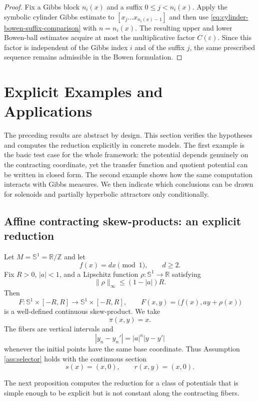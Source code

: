 \documentclass[11pt,a4paper]{article}
\newcommand{\eps}{\varepsilon}
\begin{document}
\begin{proof}
Fix a Gibbs block $n_i(x)$ and a suffix $0\le j<n_i(x)$. Apply the symbolic
cylinder Gibbs estimate to $[x_j\ldots x_{n_i(x)-1}]$ and then use
\eqref{eq:cylinder-bowen-suffix-comparison} with $n=n_i(x)$. The resulting
upper and lower Bowen-ball estimates acquire at most the multiplicative factor
$C(\eps)$. Since this factor is independent of the Gibbs index $i$ and of the
suffix $j$, the same prescribed sequence remains admissible in the Bowen
formulation.
\end{proof}

\section{Explicit Examples and Applications}
\label{sec:examples}

The preceding results are abstract by design. This section verifies the
hypotheses and computes the reduction explicitly in concrete models. The
first example is the basic test case for the whole framework: the potential
depends genuinely on the contracting coordinate, yet the transfer function
and quotient potential can be written in closed form. The second example
shows how the same computation interacts with Gibbs measures. We then
indicate which conclusions can be drawn for solenoids and partially
hyperbolic attractors only conditionally.

\subsection{Affine contracting skew-products: an explicit reduction}

Let $M=\mathbb S^1=\mathbb R/\mathbb Z$ and let
\[
f(x)=dx\pmod 1,\qquad d\ge2.
\]
Fix $R>0$, $|a|<1$, and a Lipschitz function
$\rho:\mathbb S^1\to\mathbb R$ satisfying
\[
\|\rho\|_\infty\le (1-|a|)R.
\]
Then
\[
F:\mathbb S^1\times[-R,R]\longrightarrow
\mathbb S^1\times[-R,R],
\qquad
F(x,y)=\bigl(f(x),ay+\rho(x)\bigr)
\]
is a well-defined continuous skew-product. We take
\[
\pi(x,y)=x.
\]
The fibers are vertical intervals and
\[
|y_n-y_n'|=|a|^n|y-y'|
\]
whenever the initial points have the same base coordinate. Thus Assumption
\ref{ass:selector} holds with the continuous section
\[
s(x)=(x,0),
\qquad
r(x,y)=(x,0).
\]

The next proposition computes the reduction for a class of potentials that
is simple enough to be explicit but is not constant along the contracting
fibers.
\end{document}
